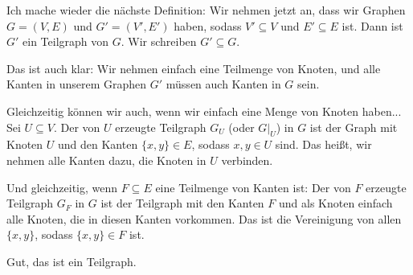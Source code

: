 \begin{spoken-clean}[00:56:56 - 00:58:54]
Ich mache wieder die nächste Definition: Wir nehmen jetzt an, dass wir Graphen $G = (V, E)$ und $G' = (V', E')$ haben, sodass $V' \subseteq V$ und $E' \subseteq E$ ist. Dann ist $G'$ ein Teilgraph von $G$. Wir schreiben $G' \subseteq G$.

Das ist auch klar: Wir nehmen einfach eine Teilmenge von Knoten, und alle Kanten in unserem Graphen $G'$ müssen auch Kanten in $G$ sein.

Gleichzeitig können wir auch, wenn wir einfach eine Menge von Knoten haben... Sei $U \subseteq V$. Der von $U$ erzeugte Teilgraph $G_U$ (oder $G|_U$) in $G$ ist der Graph mit Knoten $U$ und den Kanten $\{x, y\} \in E$, sodass $x, y \in U$ sind. Das heißt, wir nehmen alle Kanten dazu, die Knoten in $U$ verbinden.
\end{spoken-clean}

\begin{spoken-clean}[00:58:54 - 01:01:13]
Und gleichzeitig, wenn $F \subseteq E$ eine Teilmenge von Kanten ist: Der von $F$ erzeugte Teilgraph $G_F$ in $G$ ist der Teilgraph mit den Kanten $F$ und als Knoten einfach alle Knoten, die in diesen Kanten vorkommen. Das ist die Vereinigung von allen $\{x, y\}$, sodass $\{x, y\} \in F$ ist.

Gut, das ist ein Teilgraph.
\end{spoken-clean}

\begin{math-stroke}


\end{math-stroke}

